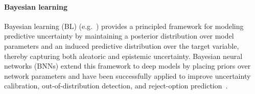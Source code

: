 \paragraph{Bayesian learning}
Bayesian learning (BL) (e.g.~\cite{Bishop-PRML-2006,Gelman-Bayesian-2013}) provides a principled framework for modeling predictive uncertainty by maintaining a posterior distribution over model parameters and an induced predictive distribution over the target variable, thereby capturing both aleatoric and epistemic uncertainty. Bayesian neural networks (BNNs) extend this framework to deep models by placing priors over network parameters and have been successfully applied to improve uncertainty calibration, out-of-distribution detection, and reject-option prediction~\cite{Kendal-What-NIPS2017,Lakshminarayanan-Ensembles-NIPS2017}.

